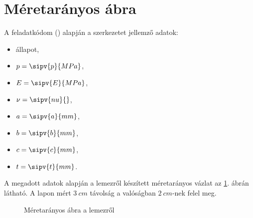 \section{Méretarányos ábra}

A feladatkódom (\texttt{})
alapján a szerkezetet jellemző adatok:
\begin{myframe}
  \vspace{-.66em}
  \begin{multicols}{2}
    \begin{itemize}
      \item {} állapot,
      \item $p = \sipv{p}{MPa}$,
      \item $E = \sipv{E}{MPa}$,
      \item $\nu = \sipv{nu}{}$,

      \item $a = \sipv{a}{mm}$,
      \item $b = \sipv{b}{mm}$,
      \item $c = \sipv{c}{mm}$,
      \item $t = \sipv{t}{mm}$.
    \end{itemize}
  \end{multicols}
\end{myframe}

A megadott adatok alapján a lemezről készített méretarányos vázlat az
\ref{fig:construction}. ábrán látható. A lapon mért $\SI{3}{cm}$ távolság
a valóságban $\SI{2}{cm}$-nek felel meg.

\begin{figure}[H]
  \centering
  
  \vspace{-2mm}
  \caption{Méretarányos ábra a lemezről}
  \vspace{-5mm}
  \label{fig:construction}
\end{figure}
